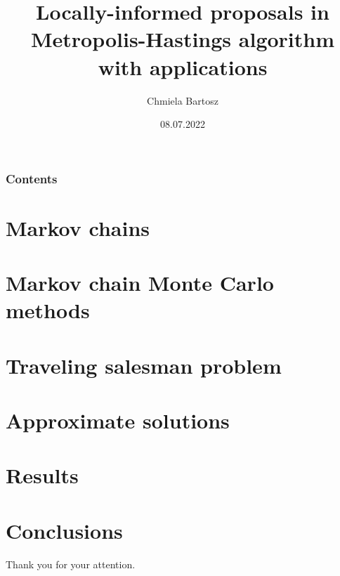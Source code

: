 





\title[LIP]{Locally-informed proposals in Metropolis-Hastings algorithm with applications}
\author[B.Chmiela]{Chmiela Bartosz}
\date{08.07.2022}



	\begin{frame}
		\titlepage
	\end{frame}
	
	\begin{frame}
		\frametitle{Contents}
		\tableofcontents
	\end{frame}

	\section{Markov chains}
		
	
	\section[MCMC]{Markov chain Monte Carlo methods}
		
	
	\section[TSP]{Traveling salesman problem}
		
	
	\section{Approximate solutions}
		
	
	\section{Results}
		

	\section{Conclusions}
		
		
	
	\begin{frame}
		\centering
		Thank you for your attention.
	\end{frame}
	
